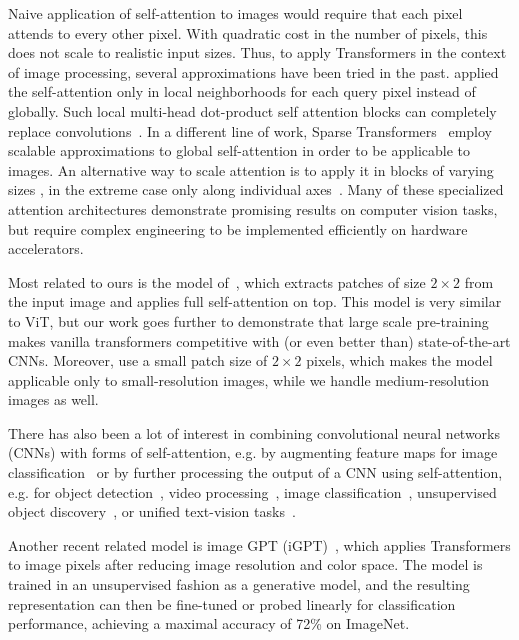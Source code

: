 Naive application of self-attention to images would require that each pixel attends to every other pixel. With quadratic cost in the number of pixels, this does not scale to realistic input sizes. Thus, to apply Transformers in the context of image processing, several approximations have been tried in the past.
\citet{parmar18-imagetransformer} applied the self-attention only in local neighborhoods for each query pixel instead of globally. Such local multi-head dot-product self attention blocks can completely replace convolutions~\citep{hu2019local,ramachandran19-sasa,zhao2020-san}. In a different line of work, Sparse Transformers~\citep{child2019-sparsetransformers} employ scalable approximations to global self-attention in order to be applicable to images. An alternative way to scale attention is to apply it in blocks of varying sizes \citep{weissenborn2019-savm}, in the extreme case only along individual axes~\citep{ho2019-axialattention,wang2020-axialdeeplab}. Many of these specialized attention architectures demonstrate promising results on computer vision tasks, but require complex engineering to be implemented efficiently on hardware accelerators.

Most related to ours is the model of~\citet{cordonnier2020-sacnn}, which extracts patches of size $2 \times 2$ from the input image and applies full self-attention on top. This model is very similar to ViT, but our work goes further to demonstrate that large scale pre-training makes vanilla transformers competitive with (or even better than) state-of-the-art CNNs. Moreover, \citet{cordonnier2020-sacnn} use a small patch size of $2 \times 2$ pixels, which makes the model applicable only to small-resolution images, while we handle medium-resolution images as well.

There has also been a lot of interest in combining convolutional neural networks (CNNs) with forms of self-attention, e.g. by augmenting feature maps for image classification~\citep{bello2019-attentionaugmentedcnn} or by further processing the output of a CNN using self-attention, e.g. for object detection~\citep{hu2018-relationnetworks, carion20-detr}, video processing~\citep{wang2018-nonlocalnn,sun2019-videobert}, image classification~\citep{wu2020-visualtransformer}, unsupervised object discovery~\citep{locatello2020-slotattention}, or unified text-vision tasks~\citep{chenuniter,vilbert,visualbert}.

Another recent related model is image GPT (iGPT)~\citep{chen20-igpt}, which applies Transformers to image pixels after reducing image resolution and color space. The model is trained in an unsupervised fashion as a generative model, and the resulting representation can then be fine-tuned or probed linearly for classification performance, achieving a maximal accuracy of 72\% on ImageNet.

